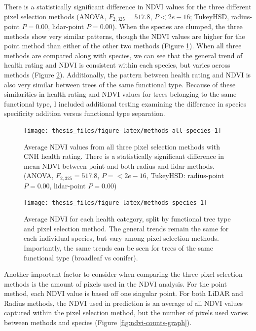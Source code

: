 \documentclass[12pt,twoside]{reedthesis}
\begin{document}
There is a statistically significant difference in NDVI values for the three different pixel selection methods (ANOVA, \(F_{2, 325}=517.8\), \(P < 2e-16\); TukeyHSD, radius-point \(P = 0.00\), lidar-point \(P = 0.00\)). When the species are clumped, the three methods show very similar patterns, though the NDVI values are higher for the point method than either of the other two methods (Figure \ref{fig:methods-all-species}). When all three methods are compared along with species, we can see that the general trend of health rating and NDVI is consistent within each species, but varies across methods (Figure \ref{fig:methods-species}). Additionally, the pattern between health rating and NDVI is also very similar between trees of the same functional type. Because of these similarities in health rating and NDVI values for trees belonging to the same functional type, I included additional testing examining the difference in species specificity addition versus functional type separation.
\begin{figure}

{\centering \texttt{[image: thesis\_files/figure-latex/methods-all-species-1]} 

}

\caption[NDVI and health rating comparison across methods]{Average NDVI values from all three pixel selection methods with CNH health rating. There is a statistically significant difference in mean NDVI between point and both radius and lidar methods. (ANOVA, $F_{2, 325}=517.8$, $P = <2e-16$, TukeyHSD: radius-point $P = 0.00$, lidar-point $P = 0.00$)}\label{fig:methods-all-species}
\end{figure}
\begin{figure}

{\centering \texttt{[image: thesis\_files/figure-latex/methods-species-1]} 

}

\caption[Average NDVI comparison between species and methods.]{Average NDVI for each health category, split by functional tree type and pixel selection method. The general trends remain the same for each individual species, but vary among pixel selection methods. Importantly, the same trends can be seen for trees of the same functional type (broadleaf vs conifer). }\label{fig:methods-species}
\end{figure}
Another important factor to consider when comparing the three pixel selection methods is the amount of pixels used in the NDVI analysis. For the point method, each NDVI value is based off one singular point. For both LiDAR and Radius methods, the NDVI used in prediction is an average of all NDVI values captured within the pixel selection method, but the number of pixels used varies between methods and species (Figure \ref{fig:ndvi-counts-graph}).
\end{document}
